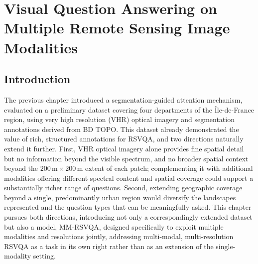 \titlespacing*{\chapter}{0pt}{-45pt}{40pt}

\chapter{Visual Question Answering on Multiple Remote Sensing Image Modalities}
\label{chap:tammi}

\startcontents[chapters]

\section{Introduction}
\label{sec:chap5_intro}

The previous chapter introduced a segmentation-guided
attention mechanism, evaluated on a preliminary dataset
covering four departments of the Île-de-France region,
using very high resolution (VHR) optical imagery and
segmentation annotations derived from BD TOPO. This dataset
already demonstrated the value of rich, structured
annotations for RSVQA, and two directions naturally extend
it further. First, VHR optical imagery alone provides fine
spatial detail but no information beyond the visible
spectrum, and no broader spatial context beyond the
$200\,\text{m} \times 200\,\text{m}$ extent of each patch;
complementing it with additional modalities offering
different spectral content and spatial coverage could
support a substantially richer range of questions. Second,
extending geographic coverage beyond a single, predominantly
urban region would diversify the landscapes represented and
the question types that can be meaningfully asked. This
chapter pursues both directions, introducing not only a
correspondingly extended dataset but also a model, MM-RSVQA,
designed specifically to exploit multiple modalities and
resolutions jointly, addressing multi-modal, multi-resolution
RSVQA as a task in its own right rather than as an extension
of the single-modality setting.


